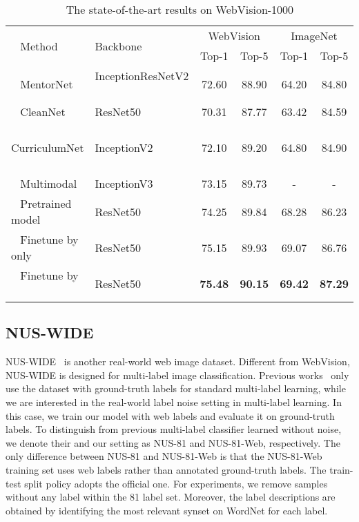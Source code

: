 \documentclass[sigconf]{acmart}
\begin{document}
\setlength{\tabcolsep}{1pt}
\begin{table}
	\centering
	\caption{The state-of-the-art results on WebVision-1000}
	\label{tab:web1000}
	\begin{tabular}{llcccc}
		\toprule
		\multicolumn{1}{l}{\multirow{2}{*}{~ Method}}  & \multicolumn{1}{l}{\multirow{2}{*}{Backbone}} & \multicolumn{2}{c}{WebVision} & \multicolumn{2}{c}{ImageNet} \\
		& \multicolumn{1}{c}{} & \multicolumn{1}{c}{Top-1} & \multicolumn{1}{c}{Top-5} & \multicolumn{1}{c}{Top-1} & \multicolumn{1}{c}{Top-5} \\
		\midrule
~ MentorNet \cite{jiang2017mentornet} &InceptionResNetV2 ~ &72.60&88.90&64.20&84.80\\
		~ CleanNet \cite{lee2018cleannet} &ResNet50&70.31&87.77&63.42&84.59\\
		~ CurriculumNet \cite{guo2018curriculumnet} ~ &InceptionV2&72.10&89.20&64.80&84.90\\
		~ Multimodal \cite{shah2019inferring} & InceptionV3&73.15&89.73&-&-\\
\midrule
		~ Pretrained model      ~ & ResNet50 &74.25&89.84&68.28&86.23\\
		~ Finetune by  only~ & ResNet50 &75.15&89.93&69.07&86.76\\
		~ Finetune by      ~ & ResNet50 &\textbf{75.48}&\textbf{90.15}&\textbf{69.42}&\textbf{87.29}\\
		\bottomrule
	\end{tabular}
\end{table}

\subsection{NUS-WIDE}
NUS-WIDE~\cite{nus-wide-civr09} is another real-world web image dataset. Different from WebVision, NUS-WIDE is designed for multi-label image classification.
Previous works~\cite{Wang2016cnnrnn,Zhu_2017_CVPR} only use the dataset with ground-truth labels for standard multi-label learning, while we are interested in the real-world label noise setting in multi-label learning. In this case, we train our model with web labels and evaluate it on ground-truth labels.
To distinguish from previous multi-label classifier learned without noise, we denote their and our setting as NUS-81 and NUS-81-Web, respectively. The only difference between NUS-81 and NUS-81-Web is that the NUS-81-Web training set uses web labels rather than annotated ground-truth labels. The train-test split policy adopts the official one.
For experiments, we remove samples without any label within the 81 label set. Moreover, the label descriptions are obtained by identifying the most relevant synset on WordNet for each label.
\end{document}
